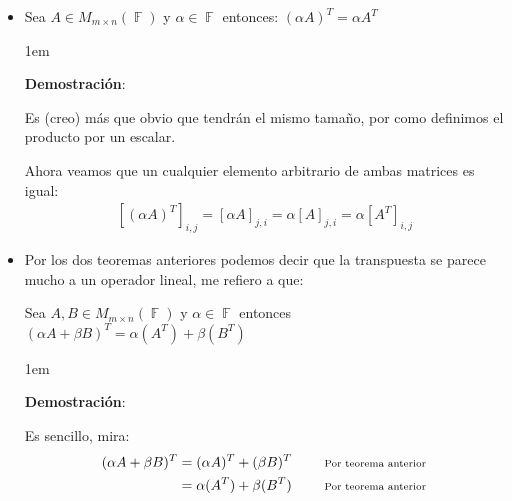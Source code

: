 \documentclass[12pt, fleqn]{report}                             %
\newenvironment{SmallIndentation}[1][0.75em]                    %
        {\begin{adjustwidth}{#1}{}\begin{footnotesize}}             %
        {\end{footnotesize}\end{adjustwidth}}                       %
\DeclareMathOperator \Space     {\quad}                         %
\newcommand \Remember[1]    {\Space\text{\scriptsize{#1}}}      %
\theoremstyle{break}                                            %
\DeclareMathOperator \GenericField {\mathbb{F}}                 %
\begin{document}
\begin{itemize}
\begin{SmallIndentation}[1em]
                        \end{SmallIndentation}

                    \item Sea $A \in M_{m \times n}(\GenericField)$ y $\alpha \in \GenericField$ entonces:
                        $(\alpha A)^T = \alpha A^T$
                        
                        \begin{SmallIndentation}[1em]
                            \textbf{Demostración}:

                            Es (creo) más que obvio que tendrán el mismo tamaño, por como definimos el producto
                            por un escalar.

                            Ahora veamos que un cualquier elemento arbitrario de ambas matrices es igual:
                            \begin{equation*}
                            \begin{split}
                                [(\alpha A)^T]_{i, j}    
                                    = [\alpha A]_{j, i}               
                                    = \alpha [A]_{j, i}
                                    = \alpha [A^T]_{i, j}
                            \end{split}
                            \end{equation*}

                        \end{SmallIndentation}

                    \item
                        Por los dos teoremas anteriores podemos decir que la transpuesta se parece mucho a 
                        un operador lineal, me refiero a que:

                        Sea $A,B \in M_{m \times n}(\GenericField)$ y $\alpha \in \GenericField$ entonces 
                        $(\alpha A + \beta B)^T = \alpha(A^T) + \beta(B^T)$

                        \begin{SmallIndentation}[1em]
                            \textbf{Demostración}:
                            
                            Es sencillo, mira:
                            \begin{align*}
                                (\alpha A + \beta B)^T
                                    &= (\alpha A)^T + (\beta B)^T
                                        && \Remember{Por teorema anterior} \\
                                    &= \alpha (A^T) + \beta (B^T)
                                        && \Remember{Por teorema anterior}
                            \end{align*}
                        

\end{SmallIndentation}
\end{itemize}
\end{document}
